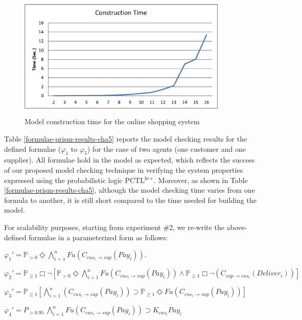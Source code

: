 \begin{figure}%
                \begin{center}
                \includegraphics[width=10cm, height=6cm]{chap5/img/time5.eps}
                \end{center}
                \caption{Model construction time for the online shopping system} \label{fig:model-time-cha5}
                \end{figure}


Table \ref{formulae-prism-results-cha5} reports the model checking
results for the defined formulae ($\varphi_1$ to $\varphi_5$) for
the case of two agents (one customer and one supplier). All
formulae hold in the model as expected, which reflects the success
of our proposed model checking technique in verifying the system
properties expressed using the probabilistic logic
PCTL$^{\textrm{kc+}}$. Moreover, as shown in Table
\ref{formulae-prism-results-cha5}, although the model checking
time varies from one formula to another, it is still short
compared to the time needed for building the model.

For scalability purposes, starting from experiment \#2, we re-write the above-defined formulae in a parameterized form as follows:


$\varphi_1'= \mathbb{P}_{>0} \Diamond \bigwedge\limits_{i=1}^n Fu(C_{cus_i\to sup} (Pay_i))$.

$\varphi_2'= \mathbb{P}_{\geq1}\Box\neg[\mathbb{P}_{>0} \Diamond \bigwedge\limits_{i=1}^n
Fu(C_{cus_i\to sup} (Pay_i))\wedge \mathbb{P}_{\geq1}\Box\neg
(C_{sup\to cus_i} (Deliver_i))]$

$\varphi_3'= \mathbb{P}_{\geq1}[\bigwedge\limits_{i=1}^n (C_{cus_i\to sup} (Pay_i))\supset \mathbb{P}_{\geq1}\Diamond Fu(C_{cus_i\to sup} (Pay_i))]$

$\varphi_4' = P_{>0.95}~ \bigwedge\limits_{i=1}^n Fu (C_{cus_i\to sup} (Pay_i)) \supset K_{cus_i} Pay_i$

